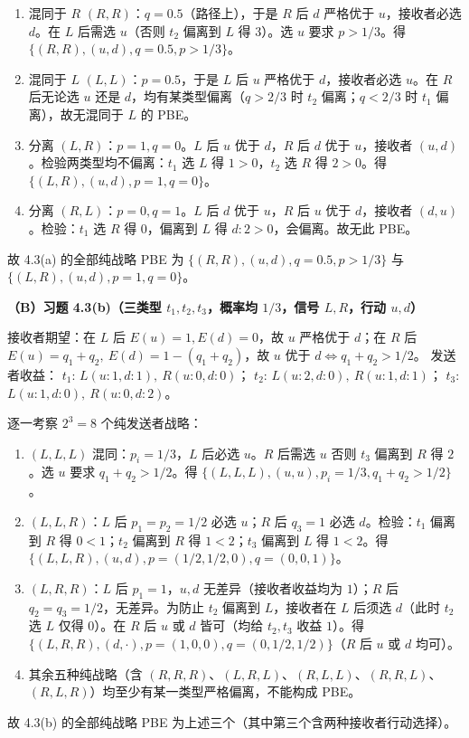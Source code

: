 \begin{enumerate}[leftmargin=1.6em]
  \item 混同于 $R$ $(R,R)$：$q=0.5$（路径上），于是 $R$ 后 $d$ 严格优于 $u$，接收者必选 $d$。在 $L$ 后需选 $u$（否则 $t_2$ 偏离到 $L$ 得 $3$）。选 $u$ 要求 $p>1/3$。得
    $\{(R,R),(u,d),q=0.5,p>1/3\}$。
  \item 混同于 $L$ $(L,L)$：$p=0.5$，于是 $L$ 后 $u$ 严格优于 $d$，接收者必选 $u$。在 $R$ 后无论选 $u$ 还是 $d$，均有某类型偏离（$q>2/3$ 时 $t_2$ 偏离；$q<2/3$ 时 $t_1$ 偏离），故无混同于 $L$ 的 PBE。
  \item 分离 $(L,R)$：$p=1,q=0$。$L$ 后 $u$ 优于 $d$，$R$ 后 $d$ 优于 $u$，接收者 $(u,d)$。检验两类型均不偏离：$t_1$ 选 $L$ 得 $1>0$，$t_2$ 选 $R$ 得 $2>0$。得
    $\{(L,R),(u,d),p=1,q=0\}$。
  \item 分离 $(R,L)$：$p=0,q=1$。$L$ 后 $d$ 优于 $u$，$R$ 后 $u$ 优于 $d$，接收者 $(d,u)$。检验：$t_1$ 选 $R$ 得 $0$，偏离到 $L$ 得 $d:2>0$，会偏离。故无此 PBE。
\end{enumerate}
故 4.3(a) 的全部纯战略 PBE 为 $\{(R,R),(u,d),q=0.5,p>1/3\}$ 与 $\{(L,R),(u,d),p=1,q=0\}$。

\textbf{（B）习题 4.3(b)（三类型 $t_1,t_2,t_3$，概率均 $1/3$，信号 $L,R$，行动 $u,d$）}

接收者期望：在 $L$ 后 $E(u)=1,E(d)=0$，故 $u$ 严格优于 $d$；在 $R$ 后 $E(u)=q_1+q_2,\ E(d)=1-(q_1+q_2)$，故 $u$ 优于 $d\iff q_1+q_2>1/2$。
发送者收益：
$t_1$: $L(u:1,d:1),\ R(u:0,d:0)$；
$t_2$: $L(u:2,d:0),\ R(u:1,d:1)$；
$t_3$: $L(u:1,d:0),\ R(u:0,d:2)$。

逐一考察 $2^3=8$ 个纯发送者战略：
\begin{enumerate}[leftmargin=1.6em]
  \item $(L,L,L)$ 混同：$p_i=1/3$，$L$ 后必选 $u$。$R$ 后需选 $u$ 否则 $t_3$ 偏离到 $R$ 得 $2$。选 $u$ 要求 $q_1+q_2>1/2$。得
    $\{(L,L,L),(u,u),p_i=1/3,q_1+q_2>1/2\}$。
  \item $(L,L,R)$：$L$ 后 $p_1=p_2=1/2$ 必选 $u$；$R$ 后 $q_3=1$ 必选 $d$。检验：$t_1$ 偏离到 $R$ 得 $0<1$；$t_2$ 偏离到 $R$ 得 $1<2$；$t_3$ 偏离到 $L$ 得 $1<2$。得
    $\{(L,L,R),(u,d),p=(1/2,1/2,0),q=(0,0,1)\}$。
  \item $(L,R,R)$：$L$ 后 $p_1=1$，$u,d$ 无差异（接收者收益均为 $1$）；$R$ 后 $q_2=q_3=1/2$，无差异。为防止 $t_2$ 偏离到 $L$，接收者在 $L$ 后须选 $d$（此时 $t_2$ 选 $L$ 仅得 $0$）。在 $R$ 后 $u$ 或 $d$ 皆可（均给 $t_2,t_3$ 收益 $1$）。得
    $\{(L,R,R),(d,\cdot),p=(1,0,0),q=(0,1/2,1/2)\}$（$R$ 后 $u$ 或 $d$ 均可）。
  \item 其余五种纯战略（含 $(R,R,R)$、$(L,R,L)$、$(R,L,L)$、$(R,R,L)$、$(R,L,R)$）均至少有某一类型严格偏离，不能构成 PBE。
\end{enumerate}
故 4.3(b) 的全部纯战略 PBE 为上述三个（其中第三个含两种接收者行动选择）。

